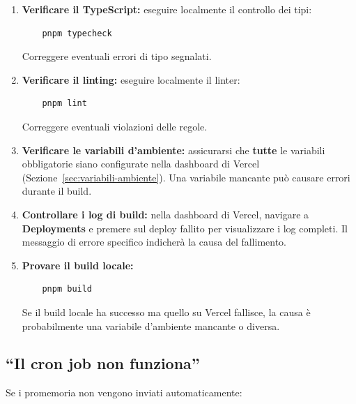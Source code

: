 \documentclass[a4paper,11pt,oneside]{book}
\begin{document}
\begin{enumerate}[leftmargin=1.5em]
  \item \textbf{Verificare il TypeScript:} eseguire localmente il controllo dei tipi:
    \begin{verbatim}
    pnpm typecheck
    \end{verbatim}
    Correggere eventuali errori di tipo segnalati.

  \item \textbf{Verificare il linting:} eseguire localmente il linter:
    \begin{verbatim}
    pnpm lint
    \end{verbatim}
    Correggere eventuali violazioni delle regole.

  \item \textbf{Verificare le variabili d'ambiente:} assicurarsi che \textbf{tutte} le variabili obbligatorie siano configurate nella dashboard di Vercel (Sezione~\ref{sec:variabili-ambiente}). Una variabile mancante pu\`o causare errori durante il build.

  \item \textbf{Controllare i log di build:} nella dashboard di Vercel, navigare a \textbf{Deployments} e premere sul deploy fallito per visualizzare i log completi. Il messaggio di errore specifico indicher\`a la causa del fallimento.

  \item \textbf{Provare il build locale:}
    \begin{verbatim}
    pnpm build
    \end{verbatim}
    Se il build locale ha successo ma quello su Vercel fallisce, la causa \`e probabilmente una variabile d'ambiente mancante o diversa.
\end{enumerate}

\subsection{``Il cron job non funziona''}

Se i promemoria non vengono inviati automaticamente:
\end{document}
